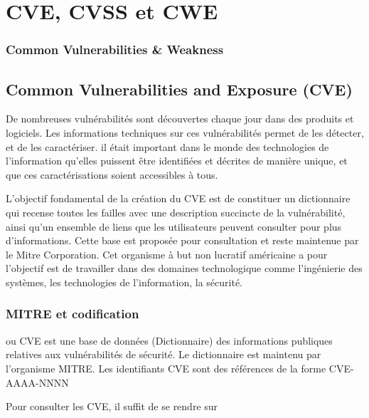 \uchap{\jobname}

\section{CVE, CVSS et CWE}


\begin{frame}
\frametitle<presentation>{Common Vulnerabilities \& Weakness}
\end{frame}


\subsection{Common Vulnerabilities and Exposure (CVE)}

De nombreuses vulnérabilités sont découvertes chaque jour dans des produits et logiciels. Les informations techniques sur ces vulnérabilités permet de les détecter, et de les caractériser. il était important dans le monde des technologies de l'information qu'elles puissent être identifiées et décrites de manière unique, et que ces caractérisations soient accessibles à tous.


L’objectif fondamental de la création du CVE est de constituer un dictionnaire qui recense toutes les failles avec une description succincte de la vulnérabilité, ainsi qu’un ensemble de liens que les utilisateurs peuvent consulter pour plus d’informations. Cette base  est proposée pour consultation et reste maintenue par le Mitre Corporation.  Cet organisme à but non lucratif américaine a pour  l'objectif est de travailler dans des domaines technologique comme l'ingénierie des systèmes, les technologies de l'information, la sécurité. 



\begin{frame}
\frametitle<presentation>{MITRE et codification}
 ou CVE est une base de données (Dictionnaire) des informations publiques relatives aux vulnérabilités de sécurité. Le dictionnaire est maintenu par l'organisme MITRE.  Les identifiants CVE sont des références de la forme CVE-AAAA-NNNN 
 
 Pour consulter les CVE,  il suffit de se rendre sur 

\end{frame}

